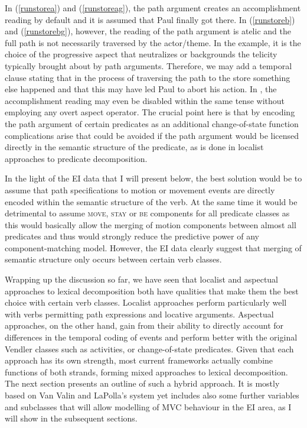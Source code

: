 In (\ref{runstorea}) and (\ref{runstoreag}), the path argument creates an accomplishment reading by default and it is assumed that Paul finally got there. In (\ref{runstoreb}) and (\ref{runstorebg}), however, the reading of the path argument is atelic and the full path is not necessarily traversed by the actor/theme. In the  example, it is the choice of the progressive aspect that neutralizes or backgrounds the telicity typically brought about by path arguments. Therefore, we may add a temporal clause stating that in the process of traversing the path to the store something else happened and that this may have led Paul to abort his action. In , the accomplishment reading may even be disabled within the same tense without employing any overt aspect operator. The crucial point here is that by encoding the path argument of certain predicates as an additional change-of-state function complications arise that could be avoided if the path argument would be licensed directly in the semantic structure of the predicate, as is done in localist approaches to predicate decomposition.

In the light of the EI data that I will present below, the best solution would be to assume that path specifications to motion or movement events are directly encoded within the semantic structure of the verb. At the same time it would be detrimental to assume \textsc{move}, \textsc{stay} or \textsc{be} components for all predicate classes as this would basically allow the merging of motion components between almost all predicates and thus would strongly reduce the predictive power of any component-matching model. However, the EI data clearly suggest that merging of semantic structure only occurs between certain verb classes.

Wrapping up the discussion so far, we have seen that localist and aspectual approaches to lexical decomposition both have qualities that make them the best choice with certain verb classes. Localist approaches perform particularly well with verbs permitting path expressions and locative arguments. Aspectual approaches, on the other hand, gain from their ability to directly account for differences in the temporal coding of events and perform better with the original Vendler classes such as activities, or change-of-state predicates. Given that each approach has its own strength, most current frameworks actually combine functions of both strands, forming mixed approaches to lexical decomposition. The next section presents an outline of such a hybrid approach. It is mostly based on Van Valin and LaPolla's system yet includes also some further variables and subclasses that will allow modelling of MVC behaviour in the EI area, as I will show in the subsequent sections.

